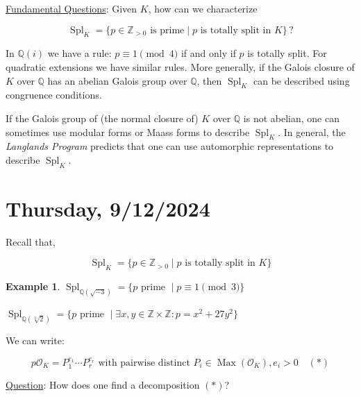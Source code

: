\documentclass[openany]{amsbook}
\numberwithin{section}{chapter}
\theoremstyle{definition}
\newtheorem*{example}{Example}
\begin{document}
\underline{Fundamental Questions}: Given \(K\), how can we characterize

\[
    \operatorname{Spl}_K = \{ p \in \mathbb{Z} _{>0} \text{ is prime} \mid p \text{ is totally split in } K \} \,?
\]

In \(\mathbb{Q} (i)\) we have a rule: \(p \equiv 1 \pmod 4\) if and only if \(p\) is totally split. For quadratic extensions we have similar rules. More generally, if the Galois closure of $K$ over $\mathbb{Q}$ has an abelian Galois group over $\mathbb{Q}$, then $\operatorname{Spl}_K$ can be described using congruence conditions.

If the Galois group of (the normal closure of) $K$ over $\mathbb{Q}$ is not abelian, one can sometimes use modular forms or Maass forms to describe $\operatorname{Spl}_K$. In general, the \emph{Langlands Program} predicts that one can use automorphic representations to describe $\operatorname{Spl}_K$.

\section*{Thursday, 9/12/2024}

Recall that,

\[
    \operatorname{Spl}_K = \{ p \in \mathbb{Z} _{>0} \mid p \text{ is totally split in } K \}
\]

\begin{example}
    \(\operatorname{Spl}_{\mathbb{Q}(\sqrt{-3})} = \{ p \text{ prime } \mid p\equiv 1 \pmod 3 \} \)

    \(\operatorname{Spl}_{\mathbb{Q} (\sqrt[3]{2})} = \{ p \text{ prime } \mid \exists x,y\in \mathbb{Z} \times \mathbb{Z} : p = x^2 +27y^2 \}  \) 

\end{example}

We can write:

\[
    p \mathcal{O} _K = P_1^{e_1} \cdots P_r^{e_r} \text{ with pairwise distinct } P_i\in \operatorname{Max} (\mathcal{O} _K), e_i > 0 \quad(\ast)
\]

\underline{Question}: How does one find a decomposition \((\ast)\)?
\end{document}

